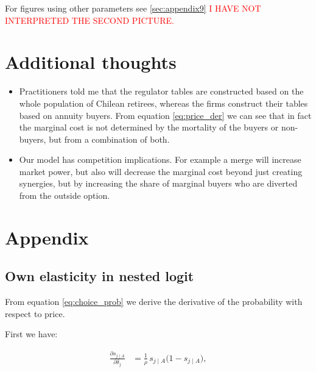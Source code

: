 \documentclass[12pt]{article}
\theoremstyle{plain}
\theoremstyle{plain}
\begin{document}
For figures using other parameters see \ref{sec:appendix9} 
\textcolor{red}{I HAVE NOT INTERPRETED THE SECOND PICTURE. }

\section{Additional thoughts}

\begin{itemize}
    \item Practitioners told me that the regulator tables are constructed based on the whole population of Chilean retirees, whereas the firms construct their tables based on annuity buyers. From equation \ref{eq:price_der} we can see that in fact the marginal cost is not determined by the mortality of the buyers or non-buyers, but from a combination of both. 

    \item Our model has competition implications. For example a merge will increase market power, but also will decrease the marginal cost beyond just creating synergies, but by increasing the share of marginal buyers who are diverted from the outside option. 
\end{itemize}


 
\section{Appendix}

\subsection{Own elasticity in nested logit}\label{sec:appendix1}
From equation \ref{eq:choice_prob} we derive the derivative of the probability with respect to price. 

First we have: 

\begin{align}\label{eq:a1}
\frac{\partial s_{j\mid A}}{\partial \delta_j}
&=\frac{1}{\rho}\,s_{j\mid A}\big(1 - s_{j\mid A}\big), 
\end{align}
\end{document}
